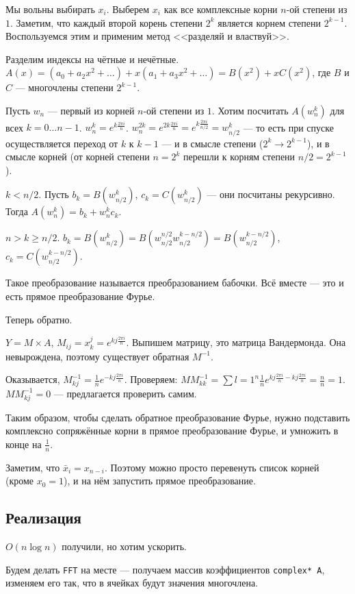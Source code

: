Мы вольны выбирать $x_i$. Выберем $x_i$ как все комплексные корни $n$-ой степени из $1$.
Заметим, что каждый второй корень степени $2^k$ является корнем степени $2^{k-1}$.
Воспользуемся этим и применим метод <<разделяй и властвуй>>.

Разделим индексы на чётные и нечётные. $A(x)=(a_0+a_2x^2+\dots)+x(a_1+a_3x^2+\dots)=B(x^2)+xC(x^2)$,
где $B$ и $C$ --- многочлены степени $2^{k-1}$.

Пусть $w_n$ --- первый из корней $n$-ой степени из $1$. Хотим посчитать $A(w_n^k)$ для всех $k=0\dots n-1$.
$w_n^k=e^{k\frac{2\pi i}{n}}$. $w_n^{2k}=e^{2k\frac{2\pi i}{n}}=e^{k\frac{2\pi i}{n/2}}=w^{k}_{n/2}$ ---
то есть при спуске осуществляется переход от $k$ к $k-1$ --- и в смысле степени ($2^k \to 2^{k-1}$), и в смысле корней
(от корней степени $n=2^k$ перешли к корням степени $n/2=2^{k-1}$).

$k<n/2$. Пусть $b_k=B(w_{n/2}^{k})$, $c_k=C(w_{n/2}^{k})$ --- они посчитаны рекурсивно. Тогда $A(w_n^{k})=b_k+w_n^{k}c_k$.

$n>k\ge n/2$. $b_k=B(w_{n/2}^{k})=B(w_{n/2}^{n/2}w_{n/2}^{k-n/2})=B(w_{n/2}^{k-n/2})$, $c_k=C(w_{n/2}^{k-n/2})$.

Такое преобразование называется преобразованием бабочки. Всё вместе --- это и есть прямое преобразование Фурье.

Теперь обратно.

$Y=M\times A$, $M_{ij}=x_k^j=e^{kj\frac{2\pi i}{n}}$. Выпишем матрицу, это матрица Вандермонда. Она невырождена, поэтому существует обратная $M^{-1}$.

Оказывается, $M^{-1}_{kj}=\frac{1}{n}e^{-kj\frac{2\pi i}{n}}$.
Проверяем: $MM^{-1}_{kk}=\sum{l=1}^{n}\frac{1}{n}e^{kj\frac{2\pi i}{n}-kj\frac{2\pi i}{n}}=\frac{n}{n}=1$.
$MM^{-1}_{kj}=0$ --- предлагается проверить самим.

Таким образом, чтобы сделать обратное преобразование Фурье,
нужно подставить комплексно сопряжённые корни в прямое преобразование Фурье, и умножить в конце на $\frac{1}{n}$.

Заметим, что $\bar x_i=x_{n-i}$. Поэтому можно просто перевенуть список корней (кроме $x_0=1$), и на нём запустить прямое преобразование.


\subsection{Реализация}

$O(n\log n)$ получили, но хотим ускорить.

Будем делать \texttt{FFT} на месте --- получаем массив коэффициентов \texttt{complex* A}, изменяем его так, что в ячейках будут значения многочлена.

